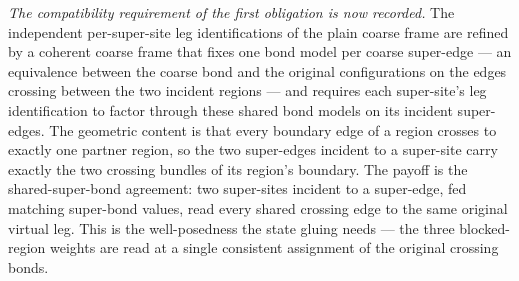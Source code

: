\documentclass{article}
\begin{document}
\begin{enumerate}
          \emph{The compatibility requirement of the first obligation is now recorded.}
          The independent per-super-site leg identifications of the plain coarse frame
          are refined by a coherent coarse frame that fixes one bond model per coarse
          super-edge --- an equivalence between the coarse bond and the original
          configurations on the edges crossing between the two incident regions --- and
          requires each super-site's leg identification to factor through these shared
          bond models on its incident super-edges. The geometric content is that every
          boundary edge of a region crosses to exactly one partner region, so the two
          super-edges incident to a super-site carry exactly the two crossing bundles of
          its region's boundary. The payoff is the shared-super-bond agreement: two
          super-sites incident to a super-edge, fed matching super-bond values, read
          every shared crossing edge to the same original virtual leg. This is the
          well-posedness the state gluing needs --- the three blocked-region weights are
          read at a single consistent assignment of the original crossing bonds.


\end{enumerate}
\end{document}
